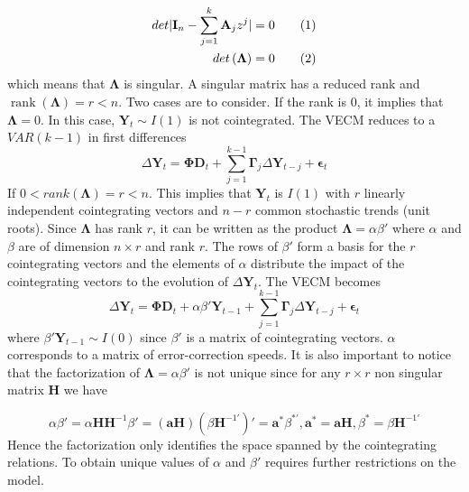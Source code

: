 \documentclass[11pt,a4,twosided,singlespacing,titlepagenumber=on]{scrreprt}
\numberwithin{equation}{chapter} %
\theoremstyle{remark}
\DeclareMathOperator{\rank}{rank}
\newcommand{\matr}[1]{\mathbf{#1}}
\newcommand\numberthis{\addtocounter{equation}{1}\tag{\theequation}}
\begin{document}
\begin{align*}
det |\matr{I}_n - \sum_{j=1}^k \matr{A}_j z^j| = 0 \numberthis \\
det \left(\matr{\Lambda} \right) = 0 \numberthis
\end{align*}
which means that $\matr{\Lambda}$ is singular. A singular matrix has a reduced rank and $\rank(\matr{\Lambda}) = r < n$. Two cases are to consider. If the rank is 0, it implies that $\matr{\Lambda} = 0$. In this case, $\matr{Y}_t \sim I(1)$ is not cointegrated. The VECM reduces to a $VAR(k-1)$ in first differences
\begin{equation}
\Delta \matr{Y}_t = \matr{\Phi} \matr{D}_t + \sum_{j=1}^{k-1} \matr{\Gamma}_j \Delta \matr{Y}_{t-j} + \matr{\epsilon}_t
\end{equation}
If $0 < rank(\matr{\Lambda}) = r < n$. This implies that $\matr{Y}_t$ is $I(1)$ with $r$ linearly independent cointegrating vectors and $n-r$ common stochastic trends (unit roots). Since $\matr{\Lambda}$ has rank $r$, it can be written as the product $\matr{\Lambda} = \alpha \beta'$ where $\alpha$ and $\beta$ are of dimension $n \times r$ and rank $r$.  The rows of $\beta'$ form a basis for the $r$ cointegrating vectors and the elements of $\alpha$ distribute the impact of the cointegrating vectors to the evolution of $\Delta \matr{Y}_t$. The VECM becomes
\begin{equation}
\Delta \matr{Y}_t = \matr{\Phi} \matr{D}_t + \alpha \beta' \matr{Y}_{t-1} + \sum_{j=1}^{k-1} \matr{\Gamma}_j \Delta \matr{Y}_{t-j} + \matr{\epsilon}_t
\end{equation}
where $\beta' \matr{Y}_{t-1} \sim I(0)$ since $\beta'$ is a matrix of cointegrating vectors. $\alpha$ corresponds to a matrix of error-correction speeds. It is also important to notice that the factorization of $\matr{\Lambda} = \alpha \beta'$ is not unique since for any $r \times r$ non singular matrix $\matr{H}$ we have

\begin{equation}
\alpha \beta' = \alpha \matr{H} \matr{H}^{-1} \beta' = (\matr{a}\matr{H})(\beta \matr{H}^{-1'})' = \matr{a}^* \beta^{*'}, \matr{a}^* = \matr{a}\matr{H}, \beta^* = \beta \matr{H}^{-1'}
\end{equation}
Hence the factorization only identifies the space spanned by the cointegrating relations. To obtain unique values of $\alpha$ and $\beta'$ requires further restrictions on the model. \\
\end{document}
